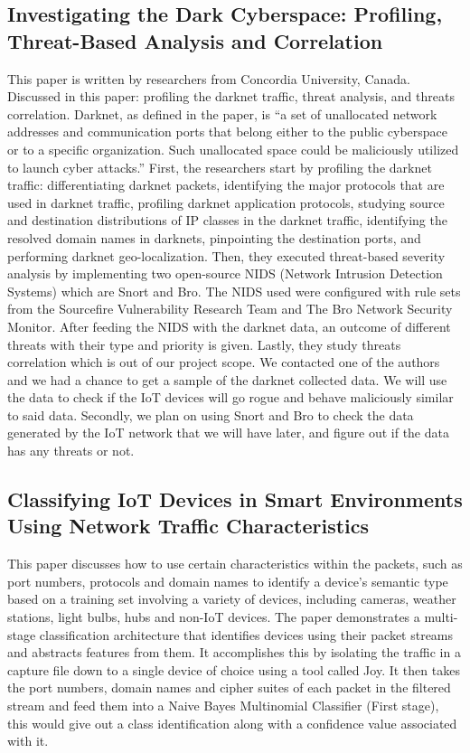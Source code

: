 \documentclass{article}
\begin{document}
\subsection{Investigating the Dark Cyberspace: Profiling, Threat-Based Analysis and Correlation}
This paper \cite{InvestigatingTheDarkCyberspace} is written by researchers from Concordia University, Canada. Discussed in this paper: profiling the darknet traffic, threat analysis, and threats correlation. Darknet, as defined in the paper, is “a set of unallocated network addresses and communication ports that belong either to the public cyberspace or to a specific organization. Such unallocated space could be maliciously utilized to launch cyber attacks.” First, the researchers start by profiling the darknet traffic: differentiating darknet packets, identifying the major protocols that are used in darknet traffic, profiling darknet application protocols, studying source and destination distributions of IP classes in the darknet traffic, identifying the resolved domain names in darknets, pinpointing the destination ports, and performing darknet geo-localization. Then, they executed threat-based severity analysis by implementing two open-source NIDS (Network Intrusion Detection Systems) which are Snort and Bro. The NIDS used were configured with rule sets from the Sourcefire Vulnerability Research Team and The Bro Network Security Monitor. After feeding the NIDS with the darknet data, an outcome of different threats with their type and priority is given. Lastly, they study threats correlation which is out of our project scope. We contacted one of the authors and we had a chance to get a sample of the darknet collected data. We will use the data to check if the IoT devices will go rogue and behave maliciously similar to said data. Secondly, we plan on using Snort and Bro to check the data generated by the IoT network that we will have later, and figure out if the data has any threats or not.

\subsection{Classifying IoT Devices in Smart Environments Using Network Traffic Characteristics}
This paper \cite{ClassifyingIoTDevicesinSmartEnvironments} discusses how to use certain characteristics within the packets, such as port numbers, protocols and domain names to identify a device's semantic type based on a training set involving a variety of devices, including cameras, weather stations, light bulbs, hubs and non-IoT devices. The paper demonstrates a multi-stage classification architecture that identifies devices using their packet streams and abstracts features from them. It accomplishes this by isolating the traffic in a capture file down to a single device of choice using a tool called Joy. It then takes the port numbers, domain names and cipher suites of each packet in the filtered stream and feed them into a Naive Bayes Multinomial Classifier (First stage), this would give out a class identification along with a confidence value associated with it.\newline
\end{document}
